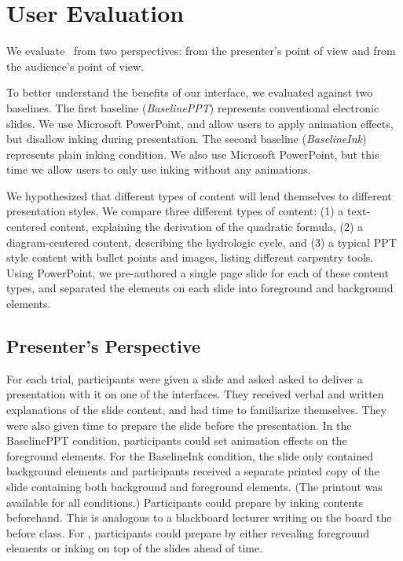 \section{User Evaluation}

We evaluate \interface\ from two perspectives: from the presenter's point of view and from the audience's point of view. 


To better understand the benefits of our interface, we evaluated \interface against two baselines. The first baseline (\textit{BaselinePPT}) represents conventional electronic slides. We use Microsoft PowerPoint, and allow users to apply animation effects, but disallow inking during presentation. The second baseline (\textit{BaselineInk}) represents plain inking condition. We also use Microsoft PowerPoint, but this time we allow users to only use inking without any animations. 

We hypothesized that different types of content will lend themselves to different presentation styles. We compare three different types of content: (1) a text-centered content, explaining the derivation of the quadratic formula, (2) a diagram-centered content, describing the hydrologic cycle, and (3) a typical PPT style content with bullet points and images, listing different carpentry tools. Using PowerPoint, we pre-authored a single page slide for each of these content types, and separated the elements on each slide into foreground and background elements.  

\subsection{Presenter's Perspective}
For each trial, participants were given a slide and asked asked to deliver a presentation with it on one of the interfaces. They received verbal and written explanations of the slide content, and had time to familiarize themselves. They were also given time to prepare the slide before the presentation. In the BaselinePPT condition, participants could set animation effects on the foreground elements. For the BaselineInk condition, the slide only contained background elements  and participants received a separate printed copy of the slide containing both background and foreground elements. (The printout was available for all conditions.) Participants could prepare by inking contents beforehand. This is analogous to a blackboard lecturer writing on the board the before class. For \interface, participants could prepare by either revealing foreground elements or inking on top of the slides ahead of time. 

